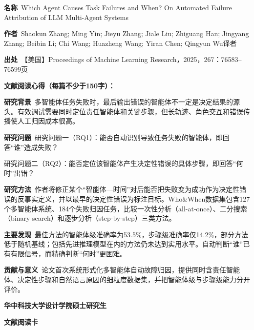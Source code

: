 \vspace{0.25em}
\noindent\underline{}\par
\vspace{0.35em}
\noindent\textbf{名称}\ Which Agent Causes Task Failures and When? On Automated Failure Attribution of LLM Multi-Agent Systems\par
\noindent\textbf{作者}\ Shaokun Zhang; Ming Yin; Jieyu Zhang; Jiale Liu; Zhiguang Han; Jingyang Zhang; Beibin Li; Chi Wang; Huazheng Wang; Yiran Chen; Qingyun Wu\quad 译者\par
\noindent\textbf{出处}\ 【美国】Proceedings of Machine Learning Research，2025，267：76583–76599\quad 页\par
\vspace{0.35em}
\noindent\textbf{文献阅读心得（每篇不少于150字）：}\par
\noindent\textbf{研究背景}\ 多智能体任务失败时，最后输出错误的智能体不一定是决定结果的源头。有效调试需要同时定位责任智能体和关键步骤，但长轨迹、角色交互和错误传播使人工归因成本很高。\par
\noindent\textbf{研究问题}\ 研究问题一（RQ1）：能否自动识别导致任务失败的智能体，即回答“谁”造成失败？\par
研究问题二（RQ2）：能否定位该智能体产生决定性错误的具体步骤，即回答“何时”出错？\par
\noindent\textbf{研究方法}\ 作者将修正某个“智能体—时间”对后能否把失败变为成功作为决定性错误的反事实定义，并以最早的决定性错误为标注目标。Who\&When数据集包含127个多智能体系统、184个失败归因任务，比较一次性分析（all-at-once）、二分搜索（binary search）和逐步分析（step-by-step）三类方法。\par
\noindent\textbf{主要发现}\ 最佳方法的智能体级准确率为53.5\%，步骤级准确率仅14.2\%，部分方法低于随机基线；包括先进推理模型在内的方法仍未达到实用水平。自动判断“谁”已有有限信号，而精确判断“何时”更困难。\par
\noindent\textbf{贡献与意义}\ 论文首次系统形式化多智能体自动故障归因，提供同时含责任智能体、决定性步骤和自然语言原因的细粒度数据集，并把智能体级与步骤级能力分开评价。\par
\clearpage
\begin{center}
{\songti\bfseries\fontsize{18.5pt}{27.75pt}\selectfont 华中科技大学设计学院硕士研究生\par}
{\songti\bfseries\fontsize{18.5pt}{27.75pt}\selectfont 文献阅读卡\par}
\end{center}
\vspace{0.25em}
